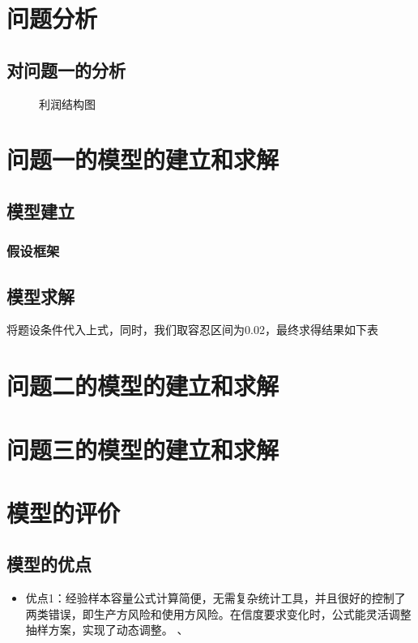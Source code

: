 \documentclass[withoutpreface,bwprint]{cumcmthesis}
\begin{document}
\section{问题分析}
\subsection{对问题一的分析}

\begin{figure}[h]
   \centering
   \resizebox{0.5\linewidth}{!}{}
   \caption{利润结构图}
   \label{fig:one}
\end{figure}


\newpage
\newpage
\section{问题一的模型的建立和求解}
\subsection{模型建立}
\subsubsection{假设框架}
\subsection{模型求解}
将题设条件代入上式，同时，我们取容忍区间为0.02，最终求得结果如下表




\section{问题二的模型的建立和求解}

\section{问题三的模型的建立和求解}

\section{模型的评价}

\subsection{模型的优点}
\begin{itemize}[itemindent=2em]
\item 优点1：经验样本容量公式计算简便，无需复杂统计工具，并且很好的控制了两类错误，即生产方风险和使用方风险。在信度要求变化时，公式能灵活调整抽样方案，实现了动态调整。
、

\end{itemize}
\end{document}
